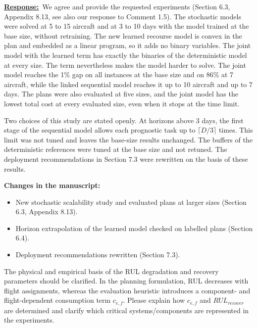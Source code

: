 \documentclass{article}
\newcommand{\response}{\vspace{0.1cm}\noindent\underline{\textbf{Response:}}\ }
\newcommand{\changes}{\vspace{0.1cm}\noindent\textbf{Changes in the manuscript:}}
\begin{document}
\response We agree and provide the requested experiments (Section 6.3, Appendix 8.13, see also our response to Comment 1.5). The stochastic models were solved at 5 to 15 aircraft and at 3 to 10 days with the model trained at the base size, without retraining. The new learned recourse model is convex in the plan and embedded as a linear program, so it adds no binary variables. The joint model with the learned term has exactly the binaries of the deterministic model at every size. The term nevertheless makes the model harder to solve. The joint model reaches the 1\% gap on all instances at the base size and on 86\% at 7 aircraft, while the linked sequential model reaches it up to 10 aircraft and up to 7 days. The plans were also evaluated at five sizes, and the joint model has the lowest total cost at every evaluated size, even when it stops at the time limit.

Two choices of this study are stated openly. At horizons above 3 days, the first stage of the sequential model allows each prognostic task up to $\lceil D/3 \rceil$ times. This limit was not tuned and leaves the base-size results unchanged. The buffers of the deterministic references were tuned at the base size and not retuned. The deployment recommendations in Section 7.3 were rewritten on the basis of these results.

\changes
\begin{itemize}[nosep]
\item New stochastic scalability study and evaluated plans at larger sizes (Section 6.3, Appendix 8.13).
\item Horizon extrapolation of the learned model checked on labelled plans (Section 6.4).
\item Deployment recommendations rewritten (Section 7.3).
\end{itemize}

\begin{cmt}{}{}
The physical and empirical basis of the RUL degradation and recovery parameters should be clarified. In the planning formulation, RUL decreases with flight assignments, whereas the evaluation heuristic introduces a component- and flight-dependent consumption term $c_{e,f}$. Please explain how $c_{e,f}$ and $RUL_{recover}$ are determined and clarify which critical systems/components are represented in the experiments.
\end{cmt}
\end{document}
